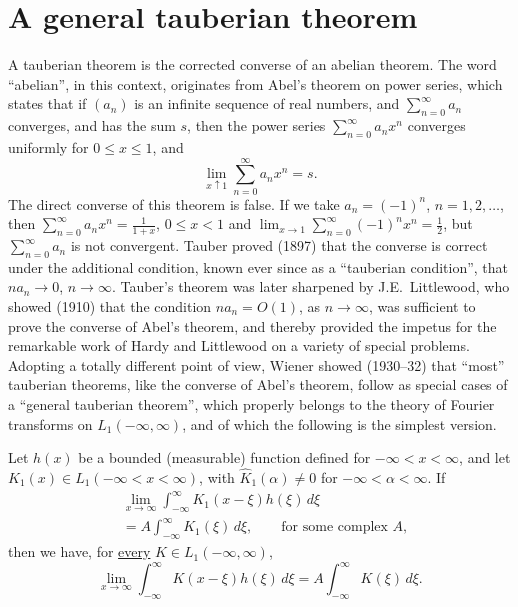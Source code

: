 \section{A general tauberian theorem}
\label{sec:I-13}

A tauberian theorem is the corrected converse of an abelian theorem. The word ``abelian'', in this context, originates from Abel's theorem on power series, which states that if $(a_n)$ is an infinite sequence of real numbers, and $\sum_{n=0}^{\infty}a_n$ converges, and has the sum $s$, then the power series $\sum_{n=0}^{\infty}a_nx^n$ converges uniformly for $0\le x\le 1$, and
\begin{equation*}
\lim_{x\uparrow 1}\sum_{n=0}^{\infty}a_nx^n=s.
\end{equation*}
The direct converse of this theorem is false. If we take $a_n=(-1)^n$, $n=1,2,\ldots$, then $\sum_{n=0}^{\infty}a_nx^n=\frac{1}{1+x}$, $0\le x<1$ and $\lim_{x\to 1}\sum_{n=0}^{\infty}(-1)^nx^n=\frac12$, but $\sum_{n=0}^{\infty}a_n$ is not convergent. Tauber proved (1897) that the converse is correct under the additional condition, known ever since as a ``tauberian condition'', that $na_n\to 0$, $n\to\infty$. Tauber's theorem was later sharpened by J.E.\ Littlewood, who showed (1910) that the condition $na_n=O(1)$, as $n\to\infty$, was sufficient to prove the converse of Abel's theorem, and thereby provided the impetus for the remarkable work of Hardy and Littlewood on a variety of special problems. Adopting a totally different point of view, Wiener showed (1930--32) that ``most'' tauberian theorems, like the converse of Abel's theorem, follow as special cases of a ``general tauberian theorem'', which properly belongs to the theory of Fourier transforms on $L_1(-\infty,\infty)$, and of which the following is the simplest version.

\begin{theorem}\label{thm:I-24}
Let $h(x)$ be a bounded (measurable) function defined for $-\infty<x<\infty$, and let $K_1(x)\in L_1(-\infty<x<\infty)$, with $\widehat K_1(\alpha)\neq 0$ for $-\infty<\alpha<\infty$. If
\begin{equation}\label{eq:I-13.1}\tag{13.1}
\begin{aligned}
&\lim_{x\to\infty}  \int_{-\infty}^{\infty}K_1(x-\xi)h(\xi)\,d\xi\\
&= A  \int_{-\infty}^{\infty}K_1(\xi)\,d\xi,  \qquad\text{for some complex }A,
\end{aligned}
\end{equation}
then we have, for \underline{every} $K\in L_1(-\infty,\infty)$,
\begin{equation}\label{eq:I-13.2}\tag{13.2}
\lim_{x\to\infty}\int_{-\infty}^{\infty}K(x-\xi)h(\xi)\,d\xi=A\int_{-\infty}^{\infty}K(\xi)\,d\xi.
\end{equation}
\end{theorem}

